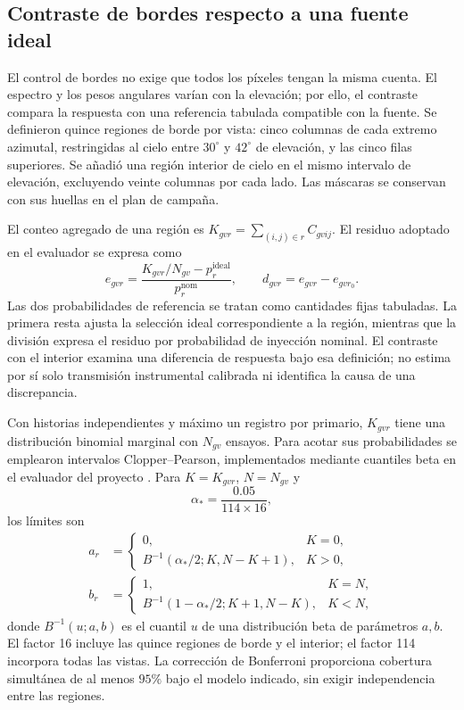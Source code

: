 \documentclass[11pt,a4paper]{article}
\begin{document}
\subsection{Contraste de bordes respecto a una fuente ideal}

El control de bordes no exige que todos los píxeles tengan la misma cuenta. El espectro y los pesos angulares varían con la elevación; por ello, el contraste compara la respuesta con una referencia tabulada compatible con la fuente. Se definieron quince regiones de borde por vista: cinco columnas de cada extremo azimutal, restringidas al cielo entre $30^\circ$ y $42^\circ$ de elevación, y las cinco filas superiores. Se añadió una región interior de cielo en el mismo intervalo de elevación, excluyendo veinte columnas por cada lado. Las máscaras se conservan con sus huellas en el plan de campaña.

El conteo agregado de una región es $K_{gvr}=\sum_{(i,j)\in r}C_{gvij}$. El residuo adoptado en el evaluador se expresa como
\begin{equation}
 e_{gvr}=\frac{K_{gvr}/N_{gv}-p^{\mathrm{ideal}}_r}{p^{\mathrm{nom}}_r},
 \qquad d_{gvr}=e_{gvr}-e_{gvr_0}.
 \label{eq:residuo}
\end{equation}
Las dos probabilidades de referencia se tratan como cantidades fijas tabuladas. La primera resta ajusta la selección ideal correspondiente a la región, mientras que la división expresa el residuo por probabilidad de inyección nominal. El contraste con el interior examina una diferencia de respuesta bajo esa definición; no estima por sí solo transmisión instrumental calibrada ni identifica la causa de una discrepancia.

Con historias independientes y máximo un registro por primario, $K_{gvr}$ tiene una distribución binomial marginal con $N_{gv}$ ensayos. Para acotar sus probabilidades se emplearon intervalos Clopper--Pearson, implementados mediante cuantiles beta en el evaluador del proyecto \cite{estadistica}. Para $K=K_{gvr}$, $N=N_{gv}$ y
\begin{equation}
 \alpha_* = \frac{0.05}{114\times16},
\end{equation}
los límites son
\begin{align}
 a_r&=\begin{cases}0,&K=0,\\
 B^{-1}(\alpha_*/2;K,N-K+1),&K>0,\end{cases}\\
 b_r&=\begin{cases}1,&K=N,\\
 B^{-1}(1-\alpha_*/2;K+1,N-K),&K<N,\end{cases}
\end{align}
donde $B^{-1}(u;a,b)$ es el cuantil $u$ de una distribución beta de parámetros $a,b$. El factor 16 incluye las quince regiones de borde y el interior; el factor 114 incorpora todas las vistas. La corrección de Bonferroni proporciona cobertura simultánea de al menos $95\%$ bajo el modelo indicado, sin exigir independencia entre las regiones.
\end{document}

